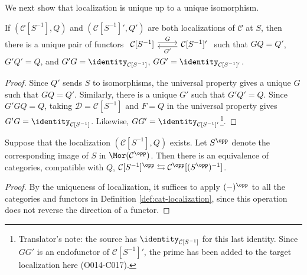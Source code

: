 We next show that localization is unique up to a unique isomorphism.

\begin{proposition}\label{prop:cat-localization-unique}
	If $(\mathcal{C}[S^{-1}],Q)$ and $(\mathcal{C}[S^{-1}]',Q')$ are both
	localizations of $\mathcal{C}$ at $S$, then there is a unique pair of
	functors
	$\begin{tikzcd}
		\mathcal{C}[S^{-1}] \arrow[r, shift left, "G"] & \mathcal{C}[S^{-1}]' \arrow[l, shift left, "{G'}"]
	\end{tikzcd}$
	such that $GQ=Q'$, $G'Q'=Q$, and
	$G'G=\identity_{\mathcal{C}[S^{-1}]}$,
	$GG'=\identity_{\mathcal{C}[S^{-1}]'}$.
\end{proposition}
\begin{proof}
	Since $Q'$ sends $S$ to isomorphisms, the universal property gives a unique
	$G$ such that $GQ=Q'$. Similarly, there is a unique $G'$ such that
	$G'Q'=Q$. Since $G'GQ=Q$, taking
	$\mathcal{D}=\mathcal{C}[S^{-1}]$ and $F=Q$ in the universal property gives
	$G'G=\identity_{\mathcal{C}[S^{-1}]}$. Likewise,
	$GG'=\identity_{\mathcal{C}[S^{-1}]'}$\footnote{Translator's note: the
	source has $\identity_{\mathcal{C}[S^{-1}]}$ for this last identity. Since
	$GG'$ is an endofunctor of $\mathcal{C}[S^{-1}]'$, the prime has been added
	to the target localization here (O014-C017).}.
\end{proof}

\begin{proposition}
	Suppose that the localization $(\mathcal{C}[S^{-1}],Q)$ exists. Let
	$S^{\opp}$ denote the corresponding image of $S$ in
	$\Mor(\mathcal{C}^{\opp})$. Then there is an equivalence of categories,
	compatible with $Q$,
	$\mathcal{C}[S^{-1}]^{\opp}\leftrightarrows
	\mathcal{C}^{\opp}[(S^{\opp})^{-1}]$.
\end{proposition}
\begin{proof}
	By the uniqueness of localization, it suffices to apply $(-)^{\opp}$ to all
	the categories and functors in Definition \ref{def:cat-localization}, since
	this operation does not reverse the direction of a functor.
\end{proof}

